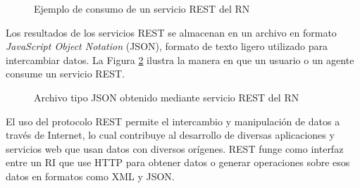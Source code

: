 \begin{figure}[!ht]
    \centering
    \caption{Ejemplo de consumo de un servicio REST del RN} %
    \label{ejemploConsumoRESTRN}
\end{figure}

Los resultados de los servicios REST se almacenan en un archivo en formato \textit{JavaScript Object Notation} (JSON), formato de texto ligero utilizado para intercambiar datos. La Figura \ref{JSONejemploConsumoRESTRN} ilustra la manera en que un usuario o un agente consume un servicio REST.\newline

\begin{figure}[!ht]
    \centering
    \caption{Archivo tipo JSON obtenido mediante servicio REST del RN} %
    \label{JSONejemploConsumoRESTRN}
\end{figure}

El uso del protocolo REST permite el intercambio y manipulaci\'on de datos a trav\'es de Internet, lo cual contribuye al desarrollo de diversas aplicaciones y servicios web que usan datos con diversos or\'igenes. REST funge como interfaz entre un RI que use HTTP para obtener datos o generar operaciones sobre esos datos en formatos como XML y JSON. 

